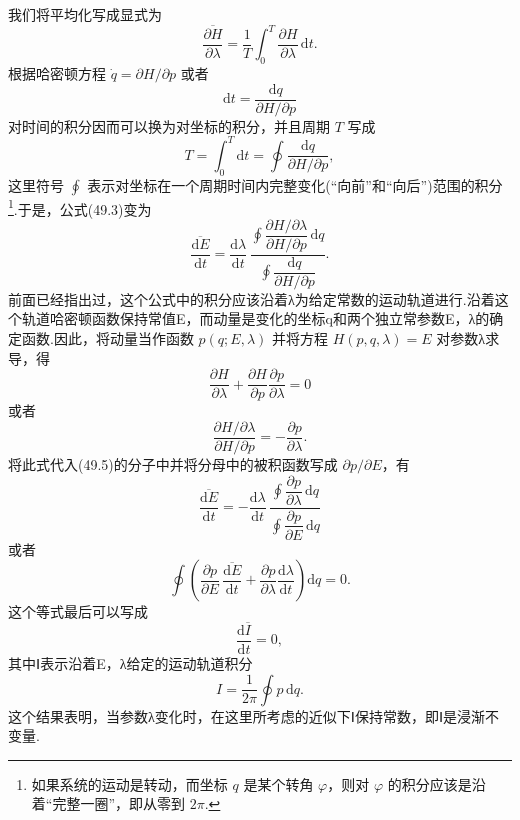 我们将平均化写成显式为
\begin{equation*}
  \overline{\frac{\partial H}{\partial\lambda}}
  =\frac{1}{T}\int_0^T\frac{\partial H}{\partial\lambda}\,\mathrm{d}t.
\end{equation*}
根据哈密顿方程 $\dot{q}=\partial H/\partial p$ 或者
\begin{equation*}
  \mathrm{d}t=\frac{\mathrm{d}q}{\partial H/\partial p}
\end{equation*}
对时间的积分因而可以换为对坐标的积分，并且周期 $T$ 写成
\begin{equation}
  T=\int_0^T\mathrm{d}t=\oint\frac{\mathrm{d}q}{\partial H/\partial p},
\end{equation}
这里符号 $\oint$
表示对坐标在一个周期时间内完整变化(“向前”和“向后”)范围的积分\footnote{如果系统的运动是转动，而坐标 $q$ 是某个转角 $\varphi$，则对 $\varphi$ 的积分应该是沿着“完整一圈”，即从零到 $2\pi$.}.于是，公式(49.3)变为
\begin{equation}
  \overline{\frac{\mathrm{d}E}{\mathrm{d}t}}
  =\frac{\mathrm{d}\lambda}{\mathrm{d}t}\,
  \frac{\oint\dfrac{\partial H/\partial\lambda}{\partial H/\partial p}\,\mathrm{d}q}
  {\oint\dfrac{\mathrm{d}q}{\partial H/\partial p}}.
\end{equation}
前面已经指出过，这个公式中的积分应该沿着λ为给定常数的运动轨道进行.沿着这个轨道哈密顿函数保持常值E，而动量是变化的坐标q和两个独立常参数E，λ的确定函数.因此，将动量当作函数
$p(q;E,\lambda)$ 并将方程 $H(p,q,\lambda)=E$ 对参数λ求导，得
\begin{equation*}
  \frac{\partial H}{\partial\lambda}
  +\frac{\partial H}{\partial p}\frac{\partial p}{\partial\lambda}=0
\end{equation*}
或者
\begin{equation*}
  \frac{\partial H/\partial\lambda}{\partial H/\partial p}
  =-\frac{\partial p}{\partial\lambda}.
\end{equation*}
将此式代入(49.5)的分子中并将分母中的被积函数写成
$\partial p/\partial E$，有
\begin{equation*}
  \overline{\frac{\mathrm{d}E}{\mathrm{d}t}}
  =-\frac{\mathrm{d}\lambda}{\mathrm{d}t}\,
  \frac{\oint\dfrac{\partial p}{\partial\lambda}\,\mathrm{d}q}
  {\oint\dfrac{\partial p}{\partial E}\,\mathrm{d}q}
\end{equation*}
或者
\begin{equation*}
  \oint\left(\frac{\partial p}{\partial E}\,
  \overline{\frac{\mathrm{d}E}{\mathrm{d}t}}
  +\frac{\partial p}{\partial\lambda}
  \frac{\mathrm{d}\lambda}{\mathrm{d}t}\right)\mathrm{d}q=0.
\end{equation*}
这个等式最后可以写成
\begin{equation}
  \frac{\mathrm{d}\overline{I}}{\mathrm{d}t}=0,
\end{equation}
其中Ⅰ表示沿着E，λ给定的运动轨道积分
\begin{equation}
  I=\frac{1}{2\pi}\oint p\,\mathrm{d}q.
\end{equation}
这个结果表明，当参数λ变化时，在这里所考虑的近似下Ⅰ保持常数，即Ⅰ是浸渐不变量.

